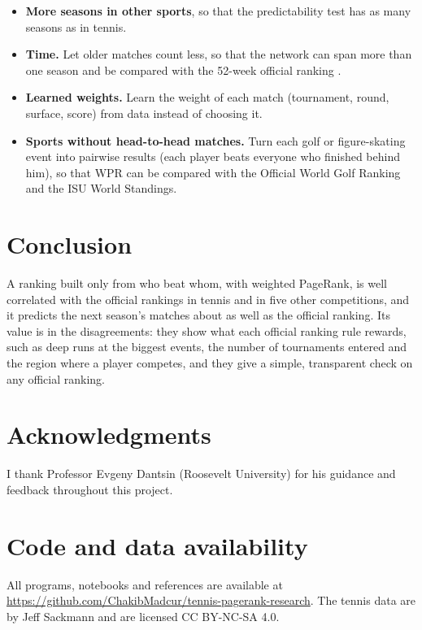 \documentclass[11pt]{article}
\begin{document}
\begin{itemize}
  \item \textbf{More seasons in other sports}, so that the predictability test has as many seasons as in tennis.
  \item \textbf{Time.} Let older matches count less, so that the network can span more than one season and be compared with the 52-week official ranking \citep{motegi2012}.
  \item \textbf{Learned weights.} Learn the weight of each match (tournament, round, surface, score) from data instead of choosing it.
  \item \textbf{Sports without head-to-head matches.} Turn each golf or figure-skating event into pairwise results (each player beats everyone who finished behind him), so that WPR can be compared with the Official World Golf Ranking and the ISU World Standings.
\end{itemize}

\section{Conclusion}

A ranking built only from who beat whom, with weighted PageRank, is well correlated with the official rankings in tennis and in five other competitions, and it predicts the next season's matches about as well as the official ranking. Its value is in the disagreements: they show what each official ranking rule rewards, such as deep runs at the biggest events, the number of tournaments entered and the region where a player competes, and they give a simple, transparent check on any official ranking.

\section*{Acknowledgments}
I thank Professor Evgeny Dantsin (Roosevelt University) for his guidance and feedback throughout this project.

\section*{Code and data availability}
All programs, notebooks and references are available at \url{https://github.com/ChakibMadcur/tennis-pagerank-research}. The tennis data are by Jeff Sackmann and are licensed CC BY-NC-SA 4.0.



\end{document}
